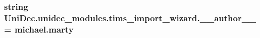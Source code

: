 \subsubsection[{\+\_\+\+\_\+author\+\_\+\+\_\+}]{\setlength{\rightskip}{0pt plus 5cm}string Uni\+Dec.\+unidec\+\_\+modules.\+tims\+\_\+import\+\_\+wizard.\+\_\+\+\_\+author\+\_\+\+\_\+ = \textquotesingle{}michael.\+marty\textquotesingle{}}\label{namespace_uni_dec_1_1unidec__modules_1_1tims__import__wizard_ab7e64264640c9f199c928a5603beccf6}
